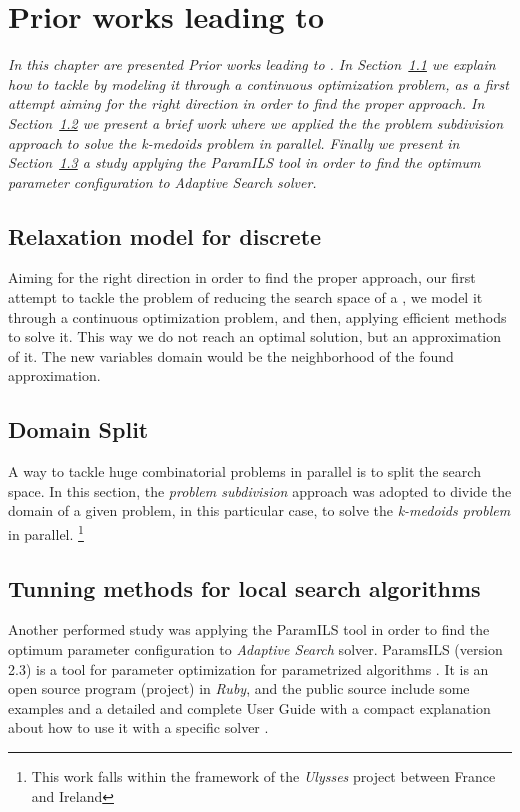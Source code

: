 \chapter{Prior works leading to \af}
\label{chap:prior}
\textit{In this chapter are presented Prior works leading to \af. In Section~\ref{sec:relaxation} we explain how to tackle \csps{} by modeling it through a continuous optimization problem, as a first attempt aiming for the right direction in order to find the proper approach. In Section~\ref{sec:split} we present a brief work where we applied the the {\it problem subdivision} approach to solve the {\it k-medoids problem} in parallel. Finally we present in Section~\ref{sec:paramils} a study applying the {\sc ParamILS} tool in order to find the optimum parameter configuration to {\it Adaptive Search} solver.}
\vspace{2ex}\vfill
\minitoc
\newpage

\section{Relaxation model for discrete \csps}
\label{sec:relaxation}

Aiming for the right direction in order to find the proper approach, our first attempt to tackle the problem of reducing the search space of a \csp, we model it through a continuous optimization problem, and then, applying efficient methods to solve it. This way we do not reach an optimal solution, but an approximation of it. The new variables domain would be the neighborhood of the found approximation.



\section{Domain Split}
\label{sec:split}

A way to tackle huge combinatorial problems in parallel is to split the search space. In this section, the {\it problem subdivision} approach was adopted to divide the domain of a given problem, in this particular case, to solve the {\it k-medoids problem} in parallel. \footnote{This work falls within the framework of the \textit{Ulysses} project between France and Ireland}

\section{Tunning methods for local search algorithms}
\label{sec:paramils}

Another performed study was applying the {\sc ParamILS} tool in order to find the optimum parameter configuration to {\it Adaptive Search} solver. {\sc ParamsILS} (version 2.3) is a tool for parameter optimization for parametrized algorithms \cite{Hutter2009}. 
It is an open source program (project) in {\it Ruby}, and the public source include some examples and a detailed and complete User Guide with a compact explanation about how to use it with a specific solver \cite{Hutter2008}.
